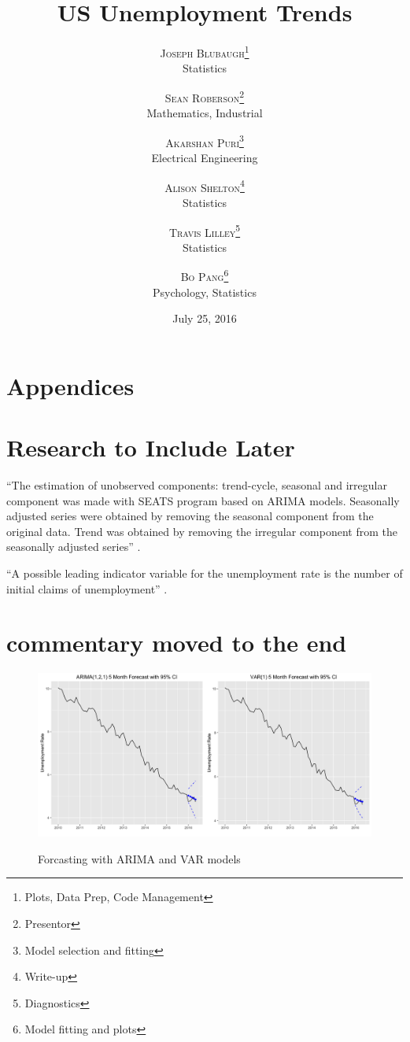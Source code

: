 \documentclass[twoside,twocolumn]{article}
\title{US Unemployment Trends} %
\author{%
\textsc{Joseph Blubaugh}\thanks{Plots, Data Prep, Code Management} \\[1ex] %
\normalsize Statistics\\ %
\and %
\textsc{Sean Roberson}\thanks{Presentor} \\[1ex] %
\normalsize Mathematics, Industrial\\ %
\and 
\textsc{Akarshan Puri}\thanks{Model selection and fitting} \\[1ex] 
\normalsize Electrical Engineering\\ 
\and 
\textsc{Alison Shelton}\thanks{Write-up} \\[1ex] 
\normalsize Statistics\\ 
\and 
\textsc{Travis Lilley}\thanks{Diagnostics} \\[1ex] 
\normalsize Statistics\\ 
\and
\textsc{Bo Pang}\thanks{Model fitting and plots} \\[1 ex]
\normalsize Psychology, Statistics
\vspace*{.5 cm}
}
\date{July 25, 2016 \vspace*{.25 cm}} %
\begin{document}

\section{Appendices}
\appendix

\section{Research to Include Later}

``The estimation of unobserved components: trend-cycle, seasonal and irregular component was made with SEATS program based on ARIMA models. Seasonally adjusted series were obtained by removing the seasonal component from the original data. Trend was obtained by removing the irregular component from the seasonally adjusted series'' \citep{VOINEAGU2012}.

``A possible leading indicator variable for the unemployment rate is the number of initial claims of unemployment'' \citep{Montgomery1998}.

\section{commentary moved to the end}

\begin{figure}[htb]
    	\centering
     	\caption{Forcasting with ARIMA and VAR models}
     	\includegraphics[width=\linewidth]{images/forcasts}
     	\label{fig:forcasts}
      \end{figure}
      
\end{document}
